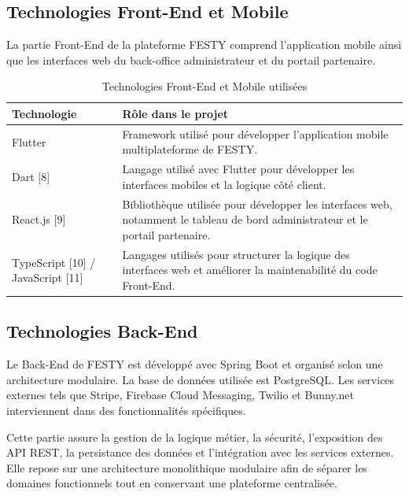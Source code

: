 \subsection{Technologies Front-End et Mobile}


La partie Front-End de la plateforme FESTY comprend l’application mobile ainsi que les interfaces web du back-office administrateur et du portail partenaire.


\begin{table}[H]
\centering
\caption{Technologies Front-End et Mobile utilisées}
\label{tableau:2-10}
\renewcommand{\arraystretch}{1.2}
\begin{tabularx}{\textwidth}{|>{\raggedright\arraybackslash}X|>{\raggedright\arraybackslash}X|}
\hline
\rowcolor[HTML]{ECF4FF}
\textbf{Technologie} & \textbf{Rôle dans le projet} \\
\hline
Flutter & Framework utilisé pour développer l’application mobile multiplateforme de FESTY. \\
\hline
Dart [8] & Langage utilisé avec Flutter pour développer les interfaces mobiles et la logique côté client. \\
\hline
React.js [9] & Bibliothèque utilisée pour développer les interfaces web, notamment le tableau de bord administrateur et le portail partenaire. \\
\hline
TypeScript [10] / JavaScript [11] & Langages utilisés pour structurer la logique des interfaces web et améliorer la maintenabilité du code Front-End. \\
\hline
\end{tabularx}
\end{table}


\subsection{Technologies Back-End}


Le Back-End de FESTY est développé avec Spring Boot et organisé selon une architecture modulaire. La base de données utilisée est PostgreSQL. Les services externes tels que Stripe, Firebase Cloud Messaging, Twilio et Bunny.net interviennent dans des fonctionnalités spécifiques.


Cette partie assure la gestion de la logique métier, la sécurité, l’exposition des API REST, la persistance des données et l’intégration avec les services externes. Elle repose sur une architecture monolithique modulaire afin de séparer les domaines fonctionnels tout en conservant une plateforme centralisée.


